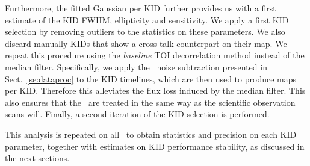 {\lp Furthermore, the fitted Gaussian per KID further provides us with
a first estimate of the KID FWHM, ellipticity and sensitivity. 
We apply a first KID selection by removing outliers to the statistics
on these parameters. We also discard manually KIDs that show a
cross-talk counterpart on their map. We repeat this
procedure using the \emph{baseline} TOI decorrelation method instead of the
median filter. Specifically, we apply the \cmoneb\ noise subtraction
presented in Sect.~\ref{se:dataproc} to the KID timelines, which are
then used to produce maps per KID. Therefore this alleviates the flux loss
induced by the median filter.}%
{\rev This also ensures that the \bms\ are treated in the same way as
the scientific observation scans will.} Finally, a second iteration of
the KID selection is performed.



This analysis is repeated on all \bms\ to obtain statistics and
precision on each KID parameter, together with estimates on KID
performance stability, as discussed in the next sections.


